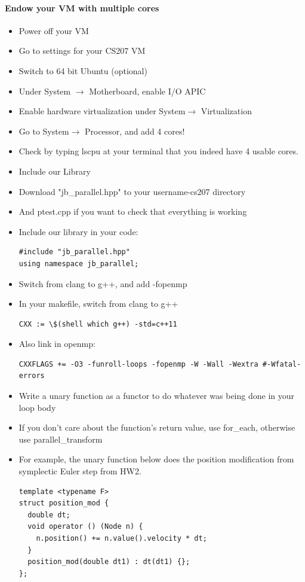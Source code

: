 \documentclass{article}
\begin{document}
\paragraph*{Endow your VM with multiple cores}
\begin{itemize}
	\item Power off your VM
\item Go to settings for your CS207 VM
\item Switch to 64 bit Ubuntu (optional)
\item Under System $\to$ Motherboard, enable I/O APIC
\item Enable hardware virtualization under System$\to$ Virtualization
\item Go to System$\to$ Processor, and add 4 cores!
\item Check by typing lscpu at your terminal that you indeed have 4 usable cores.
\item Include our Library
\item Download "jb\_parallel.hpp" to your username-cs207 directory
\item And ptest.cpp if you want to check that everything is working
\item Include our library in your code:
\begin{verbatim}
#include "jb_parallel.hpp"
using namespace jb_parallel;
\end{verbatim}

\item Switch from clang to g++, and add -fopenmp
\item In your makefile, switch from clang to g++
\begin{verbatim}
CXX := \$(shell which g++) -std=c++11
\end{verbatim}
\item Also link in openmp:
\begin{verbatim}
CXXFLAGS += -O3 -funroll-loops -fopenmp -W -Wall -Wextra #-Wfatal-errors
\end{verbatim}
\item Write a unary function as a functor to do whatever was being done in your loop body
\item If you don't care about the function's return value, use for\_each, otherwise use parallel\_transform
\item For example, the unary function below does the position modification from symplectic Euler step from HW2.
\begin{verbatim}
template <typename F>
struct position_mod {
  double dt;
  void operator () (Node n) {
    n.position() += n.value().velocity * dt;
  }
  position_mod(double dt1) : dt(dt1) {};
};
\end{verbatim}


\end{itemize}
\end{document}
